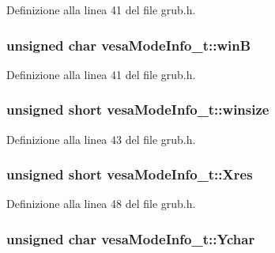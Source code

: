 Definizione alla linea 41 del file grub.\+h.

\hypertarget{structvesaModeInfo__t_a386d2bc2570ec21a98664958429247ed}{
\subsubsection[{win\+B}]{\setlength{\rightskip}{0pt plus 5cm}unsigned char vesa\+Mode\+Info\+\_\+t\+::win\+B}}\label{structvesaModeInfo__t_a386d2bc2570ec21a98664958429247ed}


Definizione alla linea 41 del file grub.\+h.

\hypertarget{structvesaModeInfo__t_a215d7dc86f8c13909156dbff6518d0c8}{
\subsubsection[{winsize}]{\setlength{\rightskip}{0pt plus 5cm}unsigned short vesa\+Mode\+Info\+\_\+t\+::winsize}}\label{structvesaModeInfo__t_a215d7dc86f8c13909156dbff6518d0c8}


Definizione alla linea 43 del file grub.\+h.

\hypertarget{structvesaModeInfo__t_a5ed5fe4414e2a46fa3670733486905ae}{
\subsubsection[{Xres}]{\setlength{\rightskip}{0pt plus 5cm}unsigned short vesa\+Mode\+Info\+\_\+t\+::\+Xres}}\label{structvesaModeInfo__t_a5ed5fe4414e2a46fa3670733486905ae}


Definizione alla linea 48 del file grub.\+h.

\hypertarget{structvesaModeInfo__t_a1c395c3097057ffd0f3d12ea9df6133d}{
\subsubsection[{Ychar}]{\setlength{\rightskip}{0pt plus 5cm}unsigned char vesa\+Mode\+Info\+\_\+t\+::\+Ychar}}\label{structvesaModeInfo__t_a1c395c3097057ffd0f3d12ea9df6133d}


